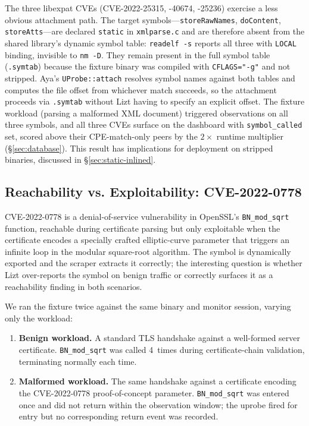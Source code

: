 \documentclass[conference]{IEEEtran}
\begin{document}
The three libexpat CVEs (CVE-2022-25315, -40674, -25236) exercise a less obvious attachment path.
The target symbols---\texttt{storeRawNames}, \texttt{doContent}, \texttt{storeAtts}---are declared \texttt{static} in \texttt{xmlparse.c} and are therefore absent from the shared library's dynamic symbol table: \texttt{readelf~-s} reports all three with \texttt{LOCAL} binding, invisible to \texttt{nm~-D}.
They remain present in the full symbol table (\texttt{.symtab}) because the fixture binary was compiled with \texttt{CFLAGS="-g"} and not stripped.
Aya's \texttt{UProbe::attach} resolves symbol names against both tables and computes the file offset from whichever match succeeds, so the attachment proceeds via \texttt{.symtab} without Lizt having to specify an explicit offset.
The fixture workload (parsing a malformed XML document) triggered observations on all three symbols, and all three CVEs surface on the dashboard with \texttt{symbol\_called} set, scored above their CPE-match-only peers by the $2\times$ runtime multiplier (\S\ref{sec:database}).
This result has implications for deployment on stripped binaries, discussed in \S\ref{sec:static-inlined}.

\subsection{Reachability vs. Exploitability: CVE-2022-0778}
\label{sec:conditional}

CVE-2022-0778 is a denial-of-service vulnerability in OpenSSL's \texttt{BN\_mod\_sqrt} function, reachable during certificate parsing but only exploitable when the certificate encodes a specially crafted elliptic-curve parameter that triggers an infinite loop in the modular square-root algorithm.
The symbol is dynamically exported and the scraper extracts it correctly; the interesting question is whether Lizt over-reports the symbol on benign traffic or correctly surfaces it as a reachability finding in both scenarios.

We ran the fixture twice against the same binary and monitor session, varying only the workload:

\begin{enumerate}[noitemsep]
  \item \textbf{Benign workload.} A standard TLS handshake against a well-formed server certificate. \texttt{BN\_mod\_sqrt} was called 4~times during certificate-chain validation, terminating normally each time.
  \item \textbf{Malformed workload.} The same handshake against a certificate encoding the CVE-2022-0778 proof-of-concept parameter. \texttt{BN\_mod\_sqrt} was entered once and did not return within the observation window; the uprobe fired for entry but no corresponding return event was recorded.
\end{enumerate}
\end{document}
